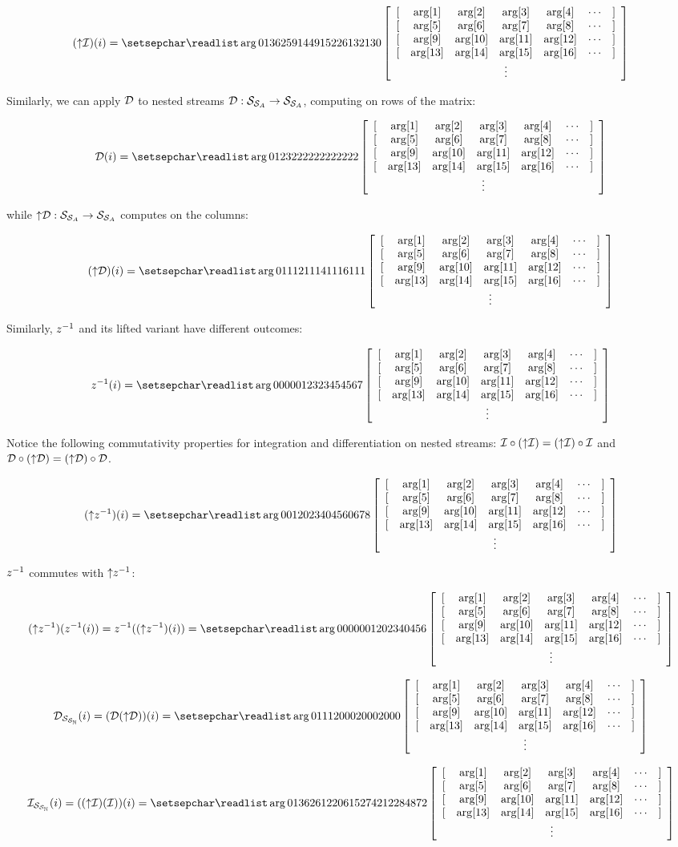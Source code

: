 $$(\lift{\I})(i) = \ssa{0 1 3 6 2 5 9 14 4 9 15 22 6 13 21 30}$$

Similarly, we can apply $\mathcal{D}$ to nested streams $\mathcal{D} : \mathcal{S}_{\mathcal{S}_{A}} \to
\mathcal{S}_{\mathcal{S}_{A}}$, computing on rows of the matrix:

$$\D(i) = \ssa{0 1 2 3 2 2 2 2 2 2 2 2 2 2 2 2}$$

\noindent while ${\uparrow}\mathcal{D} : \mathcal{S}_{\mathcal{S}_{A}} \to \mathcal{S}_{\mathcal{S}_{A}}$
computes on the columns:

$$(\lift{\D})(i) = \ssa{0 1 1 1 2 1 1 1 4 1 1 1 6 1 1 1}$$

Similarly, $z^{-1}$ and its lifted variant have different outcomes:

$$\zm(i) = \ssa{0 0 0 0 0 1 2 3 2 3 4 5 4 5 6 7}$$

Notice the following commutativity properties for integration and differentiation 
on nested streams: $\mathcal{I} \circ ({\uparrow}\mathcal{I}) = ({\uparrow}\mathcal{I}) \circ \mathcal{I}$ and 
$\mathcal{D} \circ ({\uparrow}\mathcal{D}) = ({\uparrow}\mathcal{D}) \circ \mathcal{D}$.

$$(\lift{\zm})(i) = \ssa{0 0 1 2 0 2 3 4 0 4 5 6 0 6 7 8}$$

$z^{-1}$ commutes with ${\uparrow}z^{-1}$:

$$(\lift{\zm})(\zm(i)) = \zm((\lift{\zm})(i)) = \ssa{0 0 0 0 0 0 1 2 0 2 3 4 0 4 5 6}$$


$$\D_{\stream{\stream{\N}}}(i) = (\D(\lift{\D}))(i) = \ssa{0 1 1 1 2 0 0 0 2 0 0 0 2 0 0 0}$$

$$\I_{\stream{\stream{\N}}}(i) = ((\lift{\I})(\I))(i)= \ssa{0 1 3 6 2 6 12 20 6 15 27 42 12 28 48 72}$$


